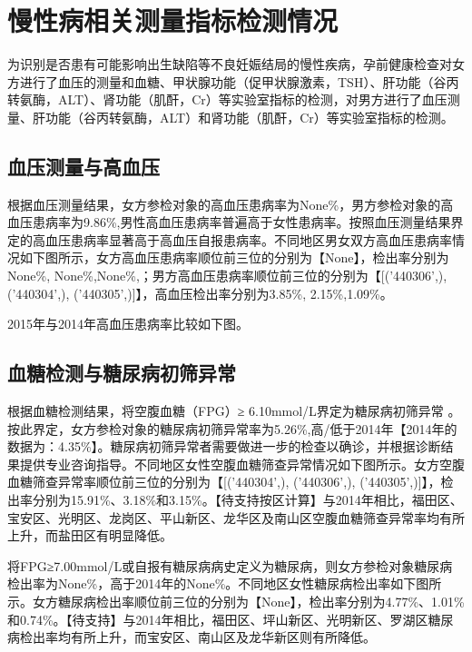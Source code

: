  

\section{慢性病相关测量指标检测情况}

为识别是否患有可能影响出生缺陷等不良妊娠结局的慢性疾病，孕前健康检查对女方进行了血压的测量和血糖、甲状腺功能（促甲状腺激素，TSH）、肝功能（谷丙转氨酶，ALT）、肾功能（肌酐，Cr）等实验室指标的检测，对男方进行了血压测量、肝功能（谷丙转氨酶，ALT）和肾功能（肌酐，Cr）等实验室指标的检测。

\subsection{血压测量与高血压}

根据血压测量结果，女方参检对象的高血压患病率为None\%，男方参检对象的高血压患病率为9.86\%,男性高血压患病率普遍高于女性患病率。按照血压测量结果界定的高血压患病率显著高于高血压自报患病率。不同地区男女双方高血压患病率情况如下图所示，女方高血压患病率顺位前三位的分别为【None】，检出率分别为None\%, None\%,None\%,；男方高血压患病率顺位前三位的分别为【[('440306',), ('440304',), ('440305',)]】，高血压检出率分别为3.85\%, 2.15\%,1.09\%。

2015年与2014年高血压患病率比较如下图。

 

\subsection{血糖检测与糖尿病初筛异常}

根据血糖检测结果，将空腹血糖（FPG）≥ 6.10mmol/L界定为糖尿病初筛异常 。按此界定，女方参检对象的糖尿病初筛异常率为5.26\%,高/低于2014年【2014年的数据为：4.35\%】。糖尿病初筛异常者需要做进一步的检查以确诊，并根据诊断结果提供专业咨询指导。不同地区女性空腹血糖筛查异常情况如下图所示。女方空腹血糖筛查异常率顺位前三位的分别为【[('440304',), ('440306',), ('440305',)]】，检出率分别为15.91\%、3.18\%和3.15\%。【待支持按区计算】与2014年相比，福田区、宝安区、光明区、龙岗区、平山新区、龙华区及南山区空腹血糖筛查异常率均有所上升，而盐田区有明显降低。

将FPG≥7.00mmol/L或自报有糖尿病病史定义为糖尿病，则女方参检对象糖尿病检出率为None\%，高于2014年的None\%。不同地区女性糖尿病检出率如下图所示。女方糖尿病检出率顺位前三位的分别为【None】，检出率分别为4.77\%、1.01\%和0.74\%。【待支持】与2014年相比，福田区、坪山新区、光明新区、罗湖区糖尿病检出率均有所上升，而宝安区、南山区及龙华新区则有所降低。


